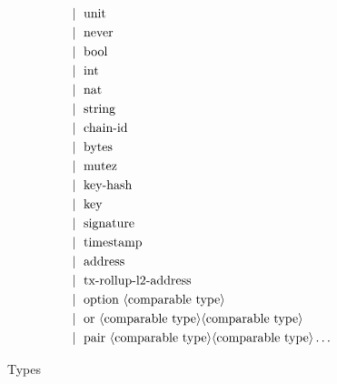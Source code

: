 \begin{figure} []
\begin{align*}
   &\mid\ \text{unit} \\
   &\mid\ \text{never} \\
   &\mid\ \text{bool} \\
   &\mid\ \text{int}\\
   &\mid\ \text{nat}\\
   &\mid\ \text{string}\\
   &\mid\ \text{chain-id}\\
   &\mid\ \text{bytes}\\
   &\mid\ \text{mutez}\\
   &\mid\ \text{key-hash}\\
   &\mid\ \text{key}\\
   &\mid\ \text{signature}\\
   &\mid\ \text{timestamp}\\
   &\mid\ \text{address}\\
   &\mid\ \text{tx-rollup-l2-address}\\
   &\mid\ \text{option}\ \langle\text{comparable type}\rangle\\
   &\mid\ \text{or}\ \langle\text{comparable type}\rangle \langle\text{comparable type}\rangle\\
   &\mid\ \text{pair}\ \langle\text{comparable type}\rangle \langle\text{comparable type}\rangle \dots \\
\end{align*}
\caption{Types}
\label{fig:type}
\end{figure}

